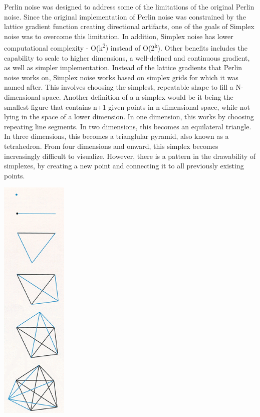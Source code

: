 \documentclass[10pt]{report}
\begin{document}
		Perlin noise was designed to address some of the limitations of the original Perlin noise. Since the original implementation of Perlin noise was constrained by the lattice gradient function creating directional artifacts, one of the goals of Simplex noise was to overcome this limitation. In addition, Simplex noise has lower computational complexity - O(k\textsuperscript{2}) instead of O(2\textsuperscript{k})\cite{sheet-simplex}. Other benefits includes the capability to scale to higher dimensions, a well-defined and continuous gradient, as well as simpler implementation. Instead of the lattice gradients that Perlin noise works on, Simplex noise works based on simplex grids for which it was named after. This involves choosing the simplest, repeatable shape to fill a N-dimensional space. Another definition of a n-simplex would be it being the smallest figure that contains n+1 given points in n-dimensional space, while not lying in the space of a lower dimension. In one dimension, this works by choosing repeating line segments. In two dimensions, this becomes an equilateral triangle. In three dimensions, this becomes a trianglular pyramid, also known as a tetrahedron. From four dimensions and onward, this simplex becomes increasingly difficult to visualize. However, there is a pattern in the drawability of simplexes, by creating a new point and connecting it to all previously existing points.
		
		\begin{minipage}{\textwidth}
			\centering
			\includegraphics[scale=1]{six simplexes}
			\label{fig:fig1}
		\end{minipage}
	
\end{document}
